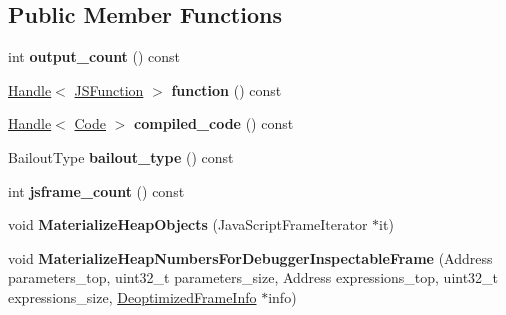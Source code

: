 \subsection*{Public Member Functions}
\begin{DoxyCompactItemize}
\item 
\hypertarget{classv8_1_1internal_1_1_deoptimizer_a9d094f3a522f8ade8b6616045354ca9d}{}int {\bfseries output\+\_\+count} () const \label{classv8_1_1internal_1_1_deoptimizer_a9d094f3a522f8ade8b6616045354ca9d}

\item 
\hypertarget{classv8_1_1internal_1_1_deoptimizer_a9599e6c218c79de5ce5399ac137181c4}{}\hyperlink{classv8_1_1internal_1_1_handle}{Handle}$<$ \hyperlink{classv8_1_1internal_1_1_j_s_function}{J\+S\+Function} $>$ {\bfseries function} () const \label{classv8_1_1internal_1_1_deoptimizer_a9599e6c218c79de5ce5399ac137181c4}

\item 
\hypertarget{classv8_1_1internal_1_1_deoptimizer_a5efa915656110fd0b24db9472a23ed05}{}\hyperlink{classv8_1_1internal_1_1_handle}{Handle}$<$ \hyperlink{classv8_1_1internal_1_1_code}{Code} $>$ {\bfseries compiled\+\_\+code} () const \label{classv8_1_1internal_1_1_deoptimizer_a5efa915656110fd0b24db9472a23ed05}

\item 
\hypertarget{classv8_1_1internal_1_1_deoptimizer_a574e1be55b702fcd905c593e88a4e220}{}Bailout\+Type {\bfseries bailout\+\_\+type} () const \label{classv8_1_1internal_1_1_deoptimizer_a574e1be55b702fcd905c593e88a4e220}

\item 
\hypertarget{classv8_1_1internal_1_1_deoptimizer_aca6d326518745b46fad81099cf2bba12}{}int {\bfseries jsframe\+\_\+count} () const \label{classv8_1_1internal_1_1_deoptimizer_aca6d326518745b46fad81099cf2bba12}

\item 
\hypertarget{classv8_1_1internal_1_1_deoptimizer_a18582e80dbab1ed0c1f5950fd0b2da3b}{}void {\bfseries Materialize\+Heap\+Objects} (Java\+Script\+Frame\+Iterator $\ast$it)\label{classv8_1_1internal_1_1_deoptimizer_a18582e80dbab1ed0c1f5950fd0b2da3b}

\item 
\hypertarget{classv8_1_1internal_1_1_deoptimizer_a2678b2aa6f6fb54217573cd9b2b68a78}{}void {\bfseries Materialize\+Heap\+Numbers\+For\+Debugger\+Inspectable\+Frame} (Address parameters\+\_\+top, uint32\+\_\+t parameters\+\_\+size, Address expressions\+\_\+top, uint32\+\_\+t expressions\+\_\+size, \hyperlink{classv8_1_1internal_1_1_deoptimized_frame_info}{Deoptimized\+Frame\+Info} $\ast$info)\label{classv8_1_1internal_1_1_deoptimizer_a2678b2aa6f6fb54217573cd9b2b68a78}


\end{DoxyCompactItemize}
